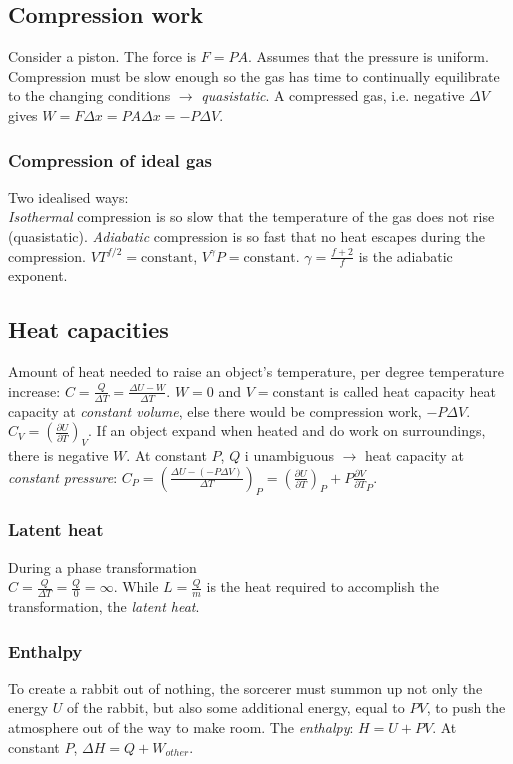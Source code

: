 \documentclass[11pt,twocolumn]{amsart}
\begin{document}
\subsection{Compression work}
Consider a piston. The force is $F=PA$. Assumes that the pressure is uniform. Compression must be slow enough so the gas has time to continually equilibrate to the changing conditions $\rightarrow$ \emph{quasistatic}. A compressed gas, i.e. negative $\Delta V$ gives $W=F\Delta x=PA\Delta x = -P\Delta V$. 
\subsubsection{Compression of ideal gas}
Two idealised ways: \\ \emph{Isothermal} compression is so slow that the temperature of the gas does not rise (quasistatic). \emph{Adiabatic} compression is so fast that no heat escapes during the compression. $VT^{f/2}=\text{constant}$, $V^{\gamma}P=\text{constant}$. $\gamma=\frac{f+2}{f}$ is the adiabatic exponent.

\subsection{Heat capacities}
Amount of heat needed to raise an object's temperature, per degree temperature increase: $C = \frac{Q}{\Delta T} = \frac{\Delta U - W}{\Delta T} $. $W=0$ and $V =\text{constant}$ is called heat capacity heat capacity at \emph{constant volume}, else there would be compression work, $-P\Delta V$. $C_V=\left(\frac{\partial U}{\partial T}\right)_V$. If an object expand when heated and do work on surroundings, there is negative $W$. At constant $P$, $Q$ i unambiguous $\rightarrow$ heat capacity at \emph{constant pressure}: $C_P = \left(\frac{\Delta U -(-P\Delta V)}{\Delta T}\right)_P=\left(\frac{\partial U}{\partial T}\right)_P + P\frac{\partial V}{\partial T}_P$.
\subsubsection{Latent heat} During a phase transformation \\ $C = \frac{Q}{\Delta T} = \frac{Q}{0} = \infty$. While $L=\frac{Q}{m}$ is the heat required to accomplish the transformation, the \emph{latent heat}.
\subsubsection{Enthalpy} To create a rabbit out of nothing, the sorcerer must summon up not only the energy $U$ of the rabbit, but also some additional energy, equal to $PV$, to push the atmosphere out of the way to make room. The \emph{enthalpy}: $H= U + PV$. At constant $P$, $\Delta H = Q + W_{other}$.
\end{document}

